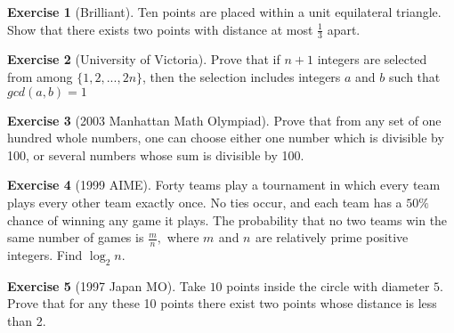 \documentclass[l1pt]{article}
\theoremstyle{plain}
\theoremstyle{definition}
\newtheorem{exercise}{Exercise}[section]
\theoremstyle{remark}
\begin{document}
\begin{exercise}[Brilliant]
Ten points are placed within a unit equilateral triangle. Show that there exists two points with distance at most $\frac{1}{3}$ apart.
\end{exercise}

\begin{exercise}[University of Victoria]
 Prove that if $n + 1$ integers are selected from among $\{1, 2,..., 2n\}$, then the selection includes integers $a$ and $b$ such that $gcd(a,b)=1$
\end{exercise}

\begin{exercise}[2003 Manhattan Math Olympiad]
 Prove that from any set of one hundred whole numbers, one can choose either one number which is divisible by 100, or several numbers whose sum is divisible by 100.
\end{exercise}

\begin{exercise}[1999 AIME]
 Forty teams play a tournament in which every team plays every other team exactly once. No ties occur, and each team has a $50 \%$ chance of winning any game it plays. The probability that no two teams win the same number of games is $\frac mn,$ where $m_{}$ and $n_{}$ are relatively prime positive integers. Find $\log_2 n.$
\end{exercise}

\begin{exercise}[1997 Japan MO]
 Take $10$ points inside the circle with diameter $5$. Prove that for any these 10 points there exist two points whose distance is less than 2.
\end{exercise}
\end{document}
